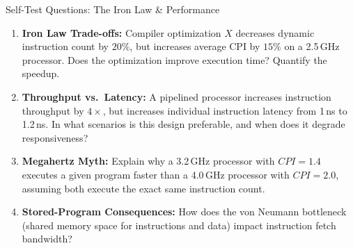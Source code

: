 \documentclass[aspectratio=169,11pt]{beamer}
\newcommand{\key}[1]{\textbf{#1}}
\begin{document}
\begin{frame}{Self-Test Questions: The Iron Law \& Performance}

\begin{enumerate}\setlength{\itemsep}{8pt}
  \item \key{Iron Law Trade-offs:} Compiler optimization $X$ decreases dynamic instruction count by $20\%$, but increases average CPI by $15\%$ on a 2.5\,GHz processor. Does the optimization improve execution time? Quantify the speedup.

  \item \key{Throughput vs.\ Latency:} A pipelined processor increases instruction throughput by $4\times$, but increases individual instruction latency from 1\,ns to 1.2\,ns. In what scenarios is this design preferable, and when does it degrade responsiveness?

  \item \key{Megahertz Myth:} Explain why a 3.2\,GHz processor with $\mathit{CPI} = 1.4$ executes a given program faster than a 4.0\,GHz processor with $\mathit{CPI} = 2.0$, assuming both execute the exact same instruction count.

  \item \key{Stored-Program Consequences:} How does the von Neumann bottleneck (shared memory space for instructions and data) impact instruction fetch bandwidth?
\end{enumerate}

\end{frame}
\end{document}

